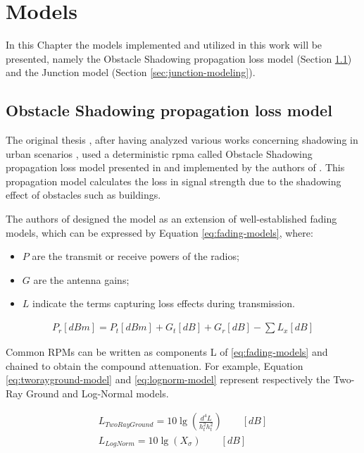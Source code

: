 
\chapter{Models}	
	In this Chapter the models implemented and utilized in this work will be presented, namely the Obstacle Shadowing propagation loss model (Section \ref{sec:shadowing}) and the Junction model (Section \ref{sec:junction-modeling}).
	
	\section{Obstacle Shadowing propagation loss model}
		\label{sec:shadowing}
		The original thesis \cite{ROM2017}, after having analyzed various works concerning shadowing in urban scenarios \cite{Giordano:2010:CST:1860058.1860065} \cite{4020783}, used a deterministic \gls{rpma} called Obstacle Shadowing propagation loss model presented in \cite{5720204} and implemented by the authors of \cite{Carpenter:2015:OMI:2756509.2756512}.  This propagation model calculates the loss in signal strength due to the shadowing effect of obstacles such as buildings. 
		
		
		The authors of \cite{5720204} designed the model as an extension of well-established fading models, which can be expressed by Equation \ref{eq:fading-models}, where:
		\begin{itemize}
			\item $P$ are the transmit or receive powers of the radios;
			\item $G$ are the antenna gains;
			\item $L$ indicate the terms capturing loss effects during transmission.
		\end{itemize}
		
		\begin{gather}
			P_r[dBm] = P_t[dBm] + G_t[dB] + G_r[dB] - \sum L_x[dB] 														\label{eq:fading-models}
		\end{gather}
	
		Common RPMs can be written as components L of \ref{eq:fading-models} and chained to obtain the compound attenuation. For example, Equation \ref{eq:tworayground-model} and \ref{eq:lognorm-model} represent respectively the Two-Ray Ground and Log-Normal models.

		\begin{gather}
			L_{TwoRayGround} = 10 \lg \left( \frac{d^4 L}{h^2_t h^2_t} \right)	\qquad [dB]		\label{eq:tworayground-model} \\
			L_{LogNorm} = 10 \lg \left( X_\sigma \right)	\qquad [dB]													\label{eq:lognorm-model}
		\end{gather}
		
